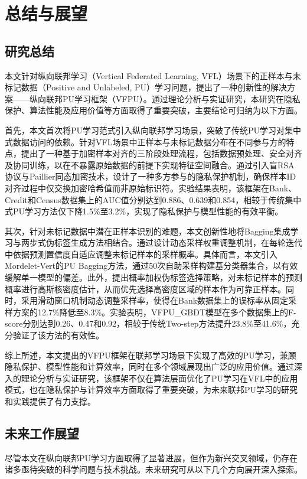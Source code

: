 

\chapter{总结与展望}
\thispagestyle{others}
\pagestyle{others}
\xiaosi

\section{研究总结}
本文针对纵向联邦学习（Vertical Federated Learning, VFL）场景下的正样本与未标记数据（Positive and Unlabeled, PU）学习问题，提出了一种创新性的解决方案——纵向联邦PU学习框架（VFPU）。通过理论分析与实证研究，本研究在隐私保护、算法性能及应用价值等方面取得了重要突破，主要结论可归纳为以下方面。

首先，本文首次将PU学习范式引入纵向联邦学习场景，突破了传统PU学习对集中式数据访问的依赖。针对VFL场景中正样本与未标记数据分布在不同参与方的特点，提出了一种基于加密样本对齐的三阶段处理流程，包括数据预处理、安全对齐及协同训练，以在不暴露原始数据的前提下实现特征空间融合。通过引入盲RSA协议与Paillier同态加密技术，设计了一种多方参与的隐私保护机制，确保样本ID对齐过程中仅交换加密哈希值而非原始标识符。实验结果表明，该框架在Bank、Credit和Census数据集上的AUC值分别达到0.886、0.639和0.854，相较于传统集中式PU学习方法仅下降1.5\%至3.2\%，实现了隐私保护与模型性能的有效平衡。

其次，针对未标记数据中潜在正样本识别的难题，本文创新性地将Bagging集成学习与两步式伪标签生成方法相结合。通过设计动态采样权重调整机制，在每轮迭代中依据预测置信度自适应调整未标记样本的采样概率。具体而言，本文引入Mordelet-Vert的PU Bagging方法，通过50次自助采样构建基分类器集合，以有效缓解单一模型的偏差。此外，提出概率加权伪标签选择策略，对未标记样本的预测概率进行高斯核密度估计，从而优先选择高密度区域的样本作为可靠正样本。同时，采用滑动窗口机制动态调整采样率，使得在Bank数据集上的误标率从固定采样方案的12.7\%降低至8.3\%。实验表明，VFPU\_GBDT模型在多个数据集上的F-score分别达到0.26、0.47和0.92，相较于传统Two-step方法提升23.8\%至41.6\%，充分验证了该方法的有效性。

综上所述，本文提出的VFPU框架在联邦学习场景下实现了高效的PU学习，兼顾隐私保护、模型性能和计算效率，同时在多个领域展现出广泛的应用价值。通过深入的理论分析与实证研究，该框架不仅在算法层面优化了PU学习在VFL中的应用模式，也在隐私保护与计算效率方面取得了重要突破，为未来联邦PU学习的研究和实践提供了有力支撑。



\section{未来工作展望}
尽管本文在纵向联邦PU学习方面取得了显著进展，但作为新兴交叉领域，仍存在诸多亟待突破的科学问题与技术挑战。未来研究可从以下几个方向展开深入探索。


